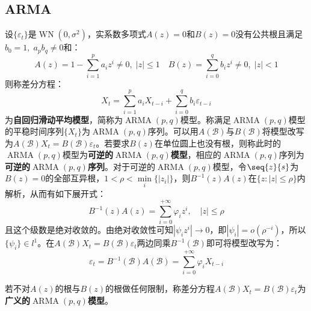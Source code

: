 \subsection{ARMA}
\begin{definition}
	设$\{\varepsilon_t\}$是$\operatorname{WN}(0,\sigma^2)$，实系数多项式$A(z)=0$和$B(z)=0$没有公共根且满足$b_0=1,\;a_pb_q\ne0$和：
	\begin{equation*}
		A(z)=1-\sum_{i=1}^{p}a_iz^i\ne0,\;|z|\leqslant1\quad B(z)=\sum_{i=0}^{q}b_iz^i\ne0,\;|z|<1
	\end{equation*}
	则称差分方程：
	\begin{equation*}
		X_t=\sum_{i=1}^{p}a_iX_{t-i}+\sum_{i=0}^{q}b_i\varepsilon_{t-i}
	\end{equation*}
	为\textbf{自回归滑动平均模型}，简称为$\operatorname{ARMA}(p,q)$模型。称满足$\operatorname{ARMA}(p,q)$模型的平稳时间序列$\{X_t\}$为$\operatorname{ARMA}(p,q)$序列。可以用$A(\mathcal{B})$与$B(\mathcal{B})$将模型改写为$A(\mathcal{B})X_t=B(\mathcal{B})\varepsilon_t$。若要求$B(z)$在单位圆上也没有根，则称此时的$\operatorname{ARMA}(p,q)$模型为\textbf{可逆的$\operatorname{ARMA}(p,q)$模型}，相应的$\operatorname{ARMA}(p,q)$序列为\textbf{可逆的$\operatorname{ARMA}(p,q)$序列}。对于可逆的$\operatorname{ARMA}(p,q)$模型，令$\seq{z}{s}$为$B(z)=0$的全部互异根，$1<\rho<\min\limits_i\{|z_i|\}$，则$B^{-1}(z)A(z)$在$\{z:|z|\leqslant\rho\}$内解析，从而有如下展开式：
	\begin{equation*}
		B^{-1}(z)A(z)=\sum_{i=0}^{+\infty}\varphi_iz^i,\quad|z|\leqslant\rho
	\end{equation*}
	且这个级数是绝对收敛的。由绝对收敛性可知$|\psi_iz^i|\to0$，即$|\psi_i|=o(\rho^{-i})$，所以$\{\psi_i\}\in l^1$。在$A(\mathcal{B})X_t=B(\mathcal{B})\varepsilon_t$两边同乘$B^{-1}(\mathcal{B})$即可将模型改写为：
	\begin{equation*}
		\varepsilon_t=B^{-1}(\mathcal{B})A(\mathcal{B})=\sum_{i=0}^{+\infty}\varphi_iX_{t-i}
	\end{equation*}\par
	若不对$A(z)$的根与$B(z)$的根做任何限制，称差分方程$A(\mathcal{B})X_t=B(\mathcal{B})\varepsilon_t$为\textbf{广义的$\operatorname{ARMA}(p,q)$模型}。
\end{definition}
